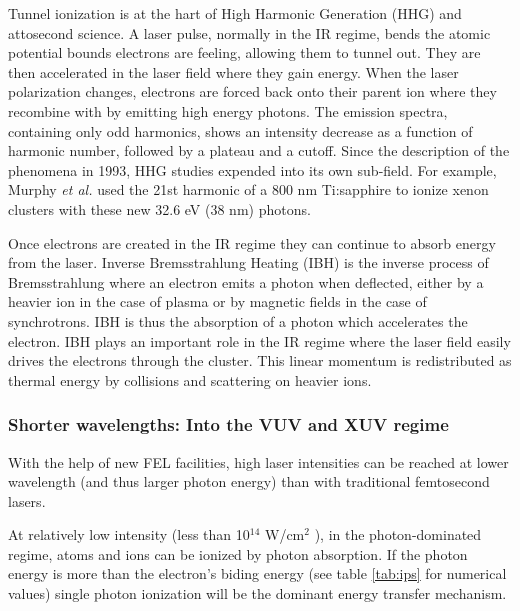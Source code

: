 Tunnel ionization is at the hart of High Harmonic Generation (HHG) and
attosecond science\cite{Fennel2010}. A laser pulse, normally in the IR regime,
bends the atomic potential bounds electrons are feeling, allowing them to tunnel
out. They are then accelerated in the laser field where they gain energy. When
the laser polarization changes, electrons are forced back onto their parent ion
where they recombine with by emitting high energy photons. The emission spectra,
containing only odd harmonics, shows an intensity decrease as a function of
harmonic number, followed by a plateau and a cutoff. Since the description
of the phenomena in 1993\cite{Corkum1993}, HHG studies expended into its own
sub-field. For example, Murphy \textit{et al.} used the 21st harmonic of a
800 nm Ti:sapphire to ionize xenon clusters\cite{Murphy2008a,Murphy2008b}
with these new 32.6 eV (38 nm) photons.


Once electrons are created in the IR regime they can continue to absorb energy
from the laser.
Inverse Bremsstrahlung Heating (IBH) is the inverse process of Bremsstrahlung
where an electron emits a photon when deflected, either by a heavier ion in the
case of plasma or by magnetic fields in the case of synchrotrons. IBH is thus
the absorption of a photon which accelerates the electron.
IBH plays an important role in the IR regime where the laser field easily
drives the electrons through the cluster\cite{Fennel2010}. This linear momentum
is redistributed as thermal energy by collisions and scattering on heavier ions.


\subsubsection{Shorter wavelengths: Into the VUV and XUV regime}
\label{section:intro:mechanisms:vuv}

With the help of new FEL facilities, high laser intensities can be reached at
lower wavelength (and thus larger photon energy) than with traditional
femtosecond lasers.

At relatively low intensity (less than 10$^{14}$ W/cm$^2$
\cite{Ramunno2008}), in the photon-dominated regime, atoms and ions
can be ionized by photon absorption. If the photon energy is more than the
electron's biding energy (see table \ref{tab:ips} for numerical values) single
photon ionization will be the dominant energy transfer mechanism.

